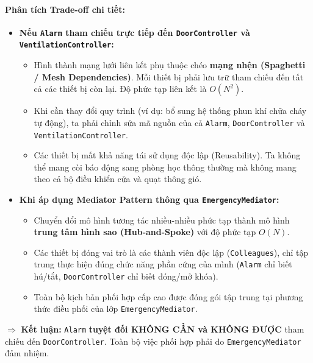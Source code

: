 \documentclass[11pt,a4paper]{article}
\begin{document}
\paragraph{Phân tích Trade-off chi tiết:}
\begin{itemize}[itemsep=1.5pt]
    \item \textbf{Nếu \texttt{Alarm} tham chiếu trực tiếp đến \texttt{DoorController} và \texttt{VentilationController}:}
    \begin{itemize}
        \item Hình thành mạng lưới liên kết phụ thuộc chéo \textbf{mạng nhện (Spaghetti / Mesh Dependencies)}. Mỗi thiết bị phải lưu trữ tham chiếu đến tất cả các thiết bị còn lại. Độ phức tạp liên kết là $O(N^2)$.
        \item Khi cần thay đổi quy trình (ví dụ: bổ sung hệ thống phun khí chữa cháy tự động), ta phải chỉnh sửa mã nguồn của cả \texttt{Alarm}, \texttt{DoorController} và \texttt{VentilationController}.
        \item Các thiết bị mất khả năng tái sử dụng độc lập (Reusability). Ta không thể mang còi báo động sang phòng học thông thường mà không mang theo cả bộ điều khiển cửa và quạt thông gió.
    \end{itemize}
    \item \textbf{Khi áp dụng Mediator Pattern thông qua \texttt{EmergencyMediator}:}
    \begin{itemize}
        \item Chuyển đổi mô hình tương tác nhiều-nhiều phức tạp thành mô hình \textbf{trung tâm hình sao (Hub-and-Spoke)} với độ phức tạp $O(N)$.
        \item Các thiết bị đóng vai trò là các thành viên độc lập (\texttt{Colleagues}), chỉ tập trung thực hiện đúng chức năng phần cứng của mình (\texttt{Alarm} chỉ biết hú/tắt, \texttt{DoorController} chỉ biết đóng/mở khóa).
        \item Toàn bộ kịch bản phối hợp cấp cao được đóng gói tập trung tại phương thức điều phối của lớp \texttt{EmergencyMediator}.
    \end{itemize}
\end{itemize}
$\Rightarrow$ \textbf{Kết luận:} \texttt{Alarm} \textbf{tuyệt đối KHÔNG CẦN và KHÔNG ĐƯỢC} tham chiếu đến \texttt{DoorController}. Toàn bộ việc phối hợp phải do \texttt{EmergencyMediator} đảm nhiệm.
\end{document}
